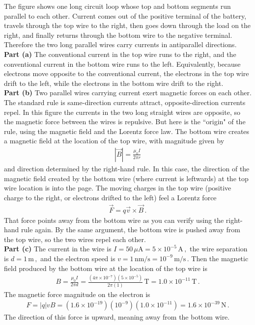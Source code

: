 \documentclass[11pt]{article}
\begin{document}
The figure shows one long circuit loop whose top and bottom segments run parallel to each other. Current comes out of the positive terminal of the battery, travels through the top wire to the right, then goes down through the load on the right, and finally returns through the bottom wire to the negative terminal. Therefore the two long parallel wires carry currents in antiparallel directions.\\

\noindent\textbf{Part (a)} The conventional current in the top wire runs to the right, and the conventional current in the bottom wire runs to the left. Equivalently, because electrons move opposite to the conventional current, the electrons in the top wire drift to the left, while the electrons in the bottom wire drift to the right.\\

\noindent\textbf{Part (b)} Two parallel wires carrying current exert magnetic forces on each other. The standard rule is same-direction currents attract,  opposite-direction currents repel. In this figure the currents in the two long straight wires are opposite, so the magnetic force between the wires is repulsive. But here is the ``origin" of the rule, using the magnetic field and the Lorentz force law. The bottom wire creates a magnetic field at the location of the top wire, with magnitude given by 
\begin{align*}
|\vec{B}|=\frac{\mu_0 I}{2\pi r}
\end{align*}
and direction determined by the right-hand rule. In this case, the direction of the magnetic field created by the bottom wire (where current is leftwards) at the top wire location is into the page. The moving charges in the top wire (positive charge to the right, or electrons drifted to the left) feel a Lorentz force
\begin{align*}
\vec{F} = q\vec{v}\times \vec{B}\,.
\end{align*}
That force points away from the bottom wire as you can verify using the right-hand rule again. By the same argument, the bottom wire is pushed away from the top wire, so the two wires repel each other.\\

\noindent\textbf{Part (c)} The current in the wire is
$I = 50\,\mu\text{A} = 5\times 10^{-5}\,\text{A}\,,$ the wire separation is $d = 1\,\text{m}\,,$ and the electron speed is $v = 1\,\text{nm/s} = 10^{-9}\,\text{m/s}\,.$
Then the magnetic field produced by the bottom wire at the location of the top wire is
\begin{align*}
B = \frac{\mu_0 I}{2\pi d}
= \frac{(4\pi\times 10^{-7})(5\times 10^{-5})}{2\pi(1)}\,\text{T}
= 1.0\times 10^{-11}\,\text{T}\,.
\end{align*}
The magnetic force magnitude on the electron is
\begin{align*}
F = |q|vB
= (1.6\times 10^{-19})(10^{-9})(1.0\times 10^{-11})
= 1.6\times 10^{-39}\,\text{N}\,.
\end{align*}
The direction of this force is upward, meaning away from the bottom wire.\\
\end{document}
